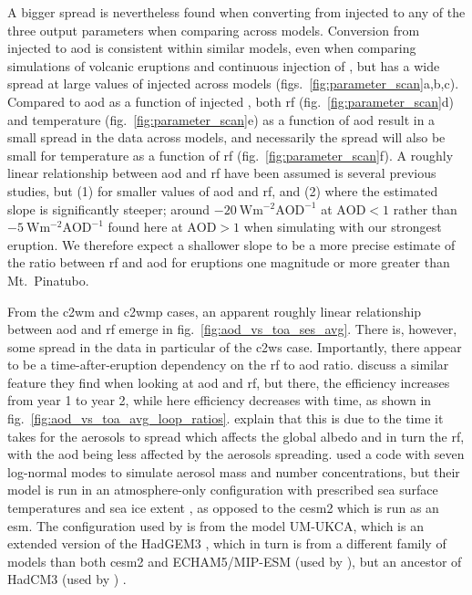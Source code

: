 \documentclass{ametsocV6.1}
\newcommand{\iso}[1][i]{{#1}njected \ce{SO2}}
\begin{document}
A bigger spread is nevertheless found when converting from \iso{} to any of the three
output parameters when comparing across models. Conversion from \iso{} to \gls{aod} is
consistent within similar models, even when comparing simulations of volcanic eruptions
\citep{timmreck2010} and continuous injection of  \citep{niemeier2015}, but has
a wide spread at large values of \iso{} across models
(figs.~\ref{fig:parameter_scan}a,b,c). Compared to \gls{aod} as a function of \iso{},
both \gls{rf} (fig.~\ref{fig:parameter_scan}d) and temperature
(fig.~\ref{fig:parameter_scan}e) as a function of \gls{aod} result in a small spread in
the data across models, and necessarily the spread will also be small for temperature as
a function of \gls{rf} (fig.~\ref{fig:parameter_scan}f). A roughly linear relationship
between \gls{aod} and \gls{rf} have been assumed is several previous studies, but (1)
for smaller values of \gls{aod} and \gls{rf}, and (2) where the estimated slope is
significantly steeper; around \(\SI{-20}{\watt\metre^{-2}\mathrm{AOD}^{-1}}\) at
\(\mathrm{AOD}<1\) rather than \(\SI{-5}{\watt\metre^{-2}\mathrm{AOD}^{-1}}\) found here
at \(\mathrm{AOD}>1\) when simulating with our strongest eruption. We therefore expect a
shallower slope to be a more precise estimate of the ratio between \gls{rf} and
\gls{aod} for eruptions one magnitude or more greater than Mt.\ Pinatubo.

From the \gls{c2wm} and \gls{c2wmp} cases, an apparent roughly linear relationship
between \gls{aod} and \gls{rf} emerge in fig.~\ref{fig:aod_vs_toa_ses_avg}. There is,
however, some spread in the data in particular of the \gls{c2ws} case. Importantly,
there appear to be a time-after-eruption dependency on the \gls{rf} to \gls{aod} ratio.
\citet{marshall2020} discuss a similar feature they find when looking at \gls{aod} and
\gls{rf}, but there, the efficiency increases from year 1 to year 2, while here
efficiency decreases with time, as shown in fig.~\ref{fig:aod_vs_toa_avg_loop_ratios}.
\citet{marshall2020} explain that this is due to the time it takes for the aerosols to
spread which affects the global albedo and in turn the \gls{rf}, with the \gls{aod}
being less affected by the aerosols spreading. \citet{marshall2019, marshall2020,
  marshall2021} used a code with seven log-normal modes to simulate aerosol mass and
number concentrations, but their model is run in an atmosphere-only configuration with
prescribed sea surface temperatures and sea ice extent \citep{marshall2019}, as opposed
to the \gls{cesm2} which is run as an \gls{esm}. The configuration used by
\citet{marshall2019} is from the model UM-UKCA, which is an extended version of the
HadGEM3 \citep{dhomse2014}, which in turn is from a different family of models than both
\gls{cesm2} and ECHAM5/MIP-ESM (used by \citet{timmreck2010,niemeier2015}), but an
ancestor of HadCM3 (used by \citet{gregory2016}) \citep{kuma2023}.
\end{document}
